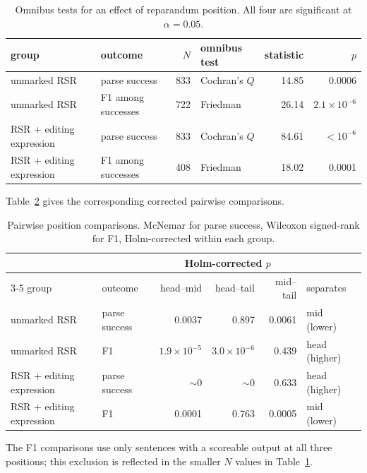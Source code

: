 \documentclass{article}
\begin{document}
\begin{table}[ht]
\centering
\small
\begin{tabular}{llrlrr}
\toprule
group & outcome & $N$ & omnibus test & statistic & $p$ \\
\midrule
unmarked RSR         & parse success       & 833 & Cochran's $Q$ & 14.85 & 0.0006 \\
unmarked RSR         & F1 among successes  & 722 & Friedman      & 26.14 & $2.1\times10^{-6}$ \\
RSR + editing expression & parse success       & 833 & Cochran's $Q$ & 84.61 & $<10^{-6}$ \\
RSR + editing expression & F1 among successes  & 408 & Friedman      & 18.02 & 0.0001 \\
\bottomrule
\end{tabular}
\caption{Omnibus tests for an effect of reparandum position. All four are
significant at $\alpha = 0.05$.}
\label{tab:position-omnibus}
\end{table}

Table~\ref{tab:position-pairwise} gives the corresponding corrected pairwise
comparisons.

\begin{table}[ht]
\centering
\small
\begin{tabular}{llrrrl}
\toprule
 & & \multicolumn{3}{c}{Holm-corrected $p$} & \\
\cmidrule(lr){3-5}
group & outcome & head--mid & head--tail & mid--tail & separates \\
\midrule
unmarked RSR         & parse success      & 0.0037 & 0.897 & 0.0061 & mid (lower) \\
unmarked RSR         & F1                 & $1.9\times10^{-5}$ & $3.0\times10^{-6}$ & 0.439 & head (higher) \\
RSR + editing expression & parse success      & ${\sim}0$ & ${\sim}0$ & 0.633 & head (higher) \\
RSR + editing expression & F1                 & 0.0001 & 0.763 & 0.0005 & mid (lower) \\
\bottomrule
\end{tabular}
\caption{Pairwise position comparisons. McNemar for parse success, Wilcoxon
signed-rank for F1, Holm-corrected within each group.}
\label{tab:position-pairwise}
\end{table}

The F1 comparisons use only sentences with a scoreable output at all three
positions; this exclusion is reflected in the smaller $N$ values in
Table~\ref{tab:position-omnibus}.
\end{document}
